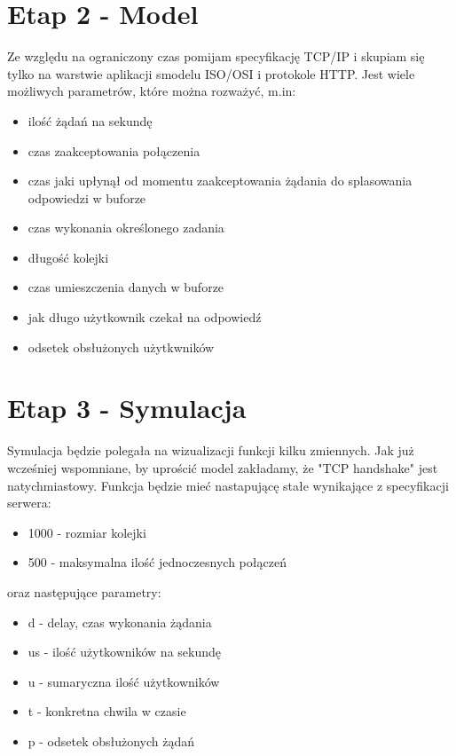 \documentclass{article}
\begin{document}
    \section{Etap 2 - Model}
    Ze względu na ograniczony czas pomijam specyfikację TCP/IP i skupiam się tylko na warstwie aplikacji smodelu ISO/OSI i protokole HTTP.\newline
    Jest wiele możliwych parametrów, które można rozważyć, m.in:
    \begin{itemize}
        \item ilość żądań na sekundę
        \item czas zaakceptowania połączenia
        \item czas jaki upłynął od momentu zaakceptowania żądania do splasowania odpowiedzi w buforze
        \item czas wykonania określonego zadania
        \item długość kolejki
        \item czas umieszczenia danych w buforze
        \item jak długo użytkownik czekał na odpowiedź
        \item odsetek obsłużonych użytkwników
    \end{itemize}


    \section{Etap 3 - Symulacja}
    Symulacja będzie polegała na wizualizacji funkcji kilku zmiennych. \newline
    Jak już wcześniej wspomniane, by uprościć model zakładamy, że "TCP handshake" jest natychmiastowy.
    Funkcja będzie mieć nastapującę stałe wynikające z specyfikacji serwera:
    \begin{itemize}
        \item 1000 - rozmiar kolejki
        \item 500 - maksymalna ilość jednoczesnych połączeń
    \end{itemize} oraz następujące parametry:
    \begin{itemize}
        \item d - delay, czas wykonania żądania
        \item us - ilość użytkowników na sekundę
        \item u - sumaryczna ilość użytkowników
        \item t - konkretna chwila w czasie
        \item p - odsetek obsłużonych żądań
    \end{itemize}
\end{document}

